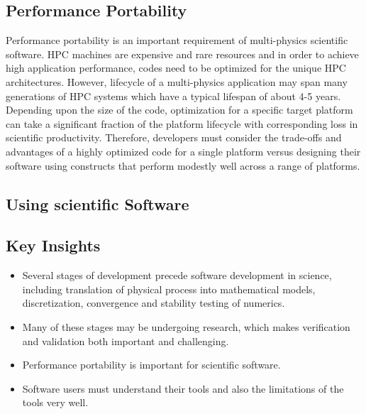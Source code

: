 \subsection{Performance Portability}
\label{sec:perfport}
Performance portability is an important requirement of multi-physics
scientific software. HPC machines are expensive and rare resources and in
order to achieve high application performance, codes need to be
optimized for the unique HPC architectures. However, lifecycle of a
multi-physics application may span many generations of HPC systems
which have a typical lifespan of about 4-5 years.  Depending upon the
size of the code, optimization for a specific target platform can take
a significant fraction of the platform lifecycle with corresponding
loss in scientific productivity.  Therefore, developers  must consider
the trade-offs and advantages of a highly optimized code for a single
platform versus designing their software using constructs that perform
modestly well across a range of platforms.  



\subsection{Using scientific Software}


\subsection*{Key Insights}
\label{lifecycle-insights}
\begin{itemize}
\item Several stages of development precede software development in
  science, including translation of physical process into mathematical
  models, discretization, convergence and stability testing of
  numerics.
\item Many of these stages may be undergoing research, which makes
  verification and validation both important and challenging.
\item Performance portability is important for scientific software.
\item Software users must understand their tools and also the
  limitations of the tools very well.
\end{itemize}